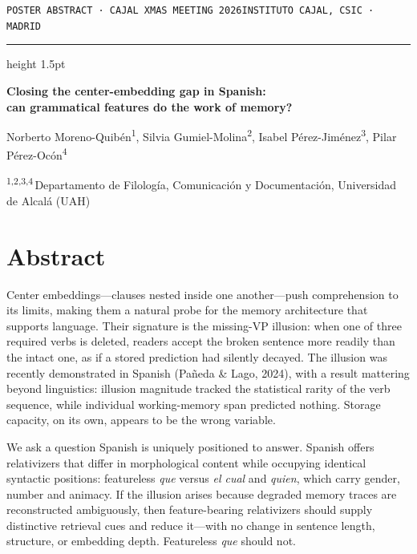 \documentclass[11pt,a4paper]{article}
\newcommand{\es}[1]{\foreignlanguage{spanish}{\textit{#1}}}
\begin{document}
{\color{accent}\small\texttt{POSTER ABSTRACT · CAJAL XMAS MEETING 2026}}\hfill{\color{muted}\small\texttt{INSTITUTO CAJAL, CSIC · MADRID}}
\par\vspace{4pt}\hrule height 1.5pt\vspace{18pt}

{\LARGE\bfseries Closing the center-embedding gap in Spanish:\\[2pt] can grammatical features do the work of memory?\par}
\vspace{14pt}

{\small
Norberto Moreno-Quibén\textsuperscript{1}, Silvia Gumiel-Molina\textsuperscript{2}, Isabel Pérez-Jiménez\textsuperscript{3}, Pilar Pérez-Ocón\textsuperscript{4}\par
\vspace{2pt}
{\color{muted}\textsuperscript{1,2,3,4}\,Departamento de Filología, Comunicación y Documentación, Universidad de Alcalá (UAH)}\par}

\vspace{10pt}{\color{muted}\hrule}\vspace{12pt}

\section*{Abstract}
\vspace{-6pt}

Center embeddings---clauses nested inside one another---push comprehension to its limits, making them a natural probe for the memory architecture that supports language. Their signature is the missing-VP illusion: when one of three required verbs is deleted, readers accept the broken sentence more readily than the intact one, as if a stored prediction had silently decayed. The illusion was recently demonstrated in Spanish (Pañeda \& Lago, 2024), with a result mattering beyond linguistics: illusion magnitude tracked the statistical rarity of the verb sequence, while individual working-memory span predicted nothing. Storage capacity, on its own, appears to be the wrong variable.

We ask a question Spanish is uniquely positioned to answer. Spanish offers relativizers that differ in morphological content while occupying identical syntactic positions: featureless \es{que} versus \es{el cual} and \es{quien}, which carry gender, number and animacy. If the illusion arises because degraded memory traces are reconstructed ambiguously, then feature-bearing relativizers should supply distinctive retrieval cues and reduce it---with no change in sentence length, structure, or embedding depth. Featureless \es{que} should not.
\end{document}
